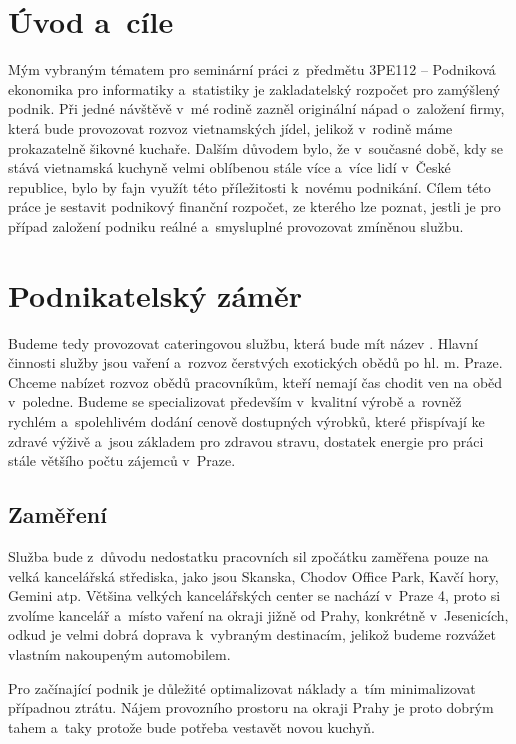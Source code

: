 \section*{Úvod a~cíle}
Mým vybraným tématem pro seminární práci z~předmětu 3PE112 -- Podniková ekonomika pro informatiky a~statistiky je zakladatelský rozpočet pro zamýšlený podnik. Při jedné návštěvě v~mé rodině zazněl originální nápad o~založení firmy, která bude provozovat rozvoz vietnamských jídel, jelikož v~rodině máme prokazatelně šikovné kuchaře. Dalším důvodem bylo, že v~současné době, kdy se stává vietnamská kuchyně velmi oblíbenou stále více a~více lidí v~České republice, bylo by fajn využít této příležitosti k~novému podnikání. Cílem této práce je sestavit podnikový finanční rozpočet, ze kterého lze poznat, jestli je pro případ založení podniku reálné a~smysluplné provozovat zmíněnou službu.





\section{Podnikatelský záměr}
Budeme tedy provozovat cateringovou službu, která bude mít název . Hlavní činnosti služby jsou vaření a~rozvoz čerstvých exotických obědů po hl. m. Praze. Chceme nabízet rozvoz obědů pracovníkům, kteří nemají čas chodit ven na oběd v~poledne. Budeme se specializovat především v~kvalitní výrobě a~rovněž rychlém a~spolehlivém dodání cenově dostupných výrobků, které přispívají ke zdravé výživě a~jsou základem pro zdravou stravu, dostatek energie pro práci stále většího počtu zájemců v~Praze.

\subsection{Zaměření}
Služba bude z~důvodu nedostatku pracovních sil zpočátku zaměřena pouze na velká kancelářská střediska, jako jsou Skanska, Chodov Office Park, Kavčí hory, Gemini atp. Většina velkých kancelářských center se nachází v~Praze 4, proto si zvolíme kancelář a~místo vaření na okraji jižně od Prahy, konkrétně v~Jesenicích, odkud je velmi dobrá doprava k~vybraným destinacím, jelikož budeme rozvážet vlastním nakoupeným automobilem. 

Pro začínající podnik je důležité optimalizovat náklady a~tím minimalizovat případnou ztrátu. Nájem provozního prostoru na okraji Prahy je proto dobrým tahem a~taky protože bude potřeba vestavět novou kuchyň.

